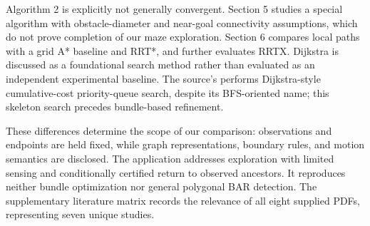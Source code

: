 Algorithm 2 is explicitly not generally convergent. Section 5 studies a special algorithm with obstacle-diameter and near-goal connectivity assumptions, which do not prove completion of our maze exploration. Section 6 compares local paths with a grid A* baseline and RRT*, and further evaluates RRTX. Dijkstra is discussed as a foundational search method rather than evaluated as an independent experimental baseline. The source's  performs Dijkstra-style cumulative-cost priority-queue search, despite its BFS-oriented name; this skeleton search precedes bundle-based refinement.

These differences determine the scope of our comparison: observations and endpoints are held fixed, while graph representations, boundary rules, and motion semantics are disclosed. The application addresses exploration with limited sensing and conditionally certified return to observed ancestors. It reproduces neither bundle optimization nor general polygonal BAR detection. The supplementary literature matrix records the relevance of all eight supplied PDFs, representing seven unique studies.
